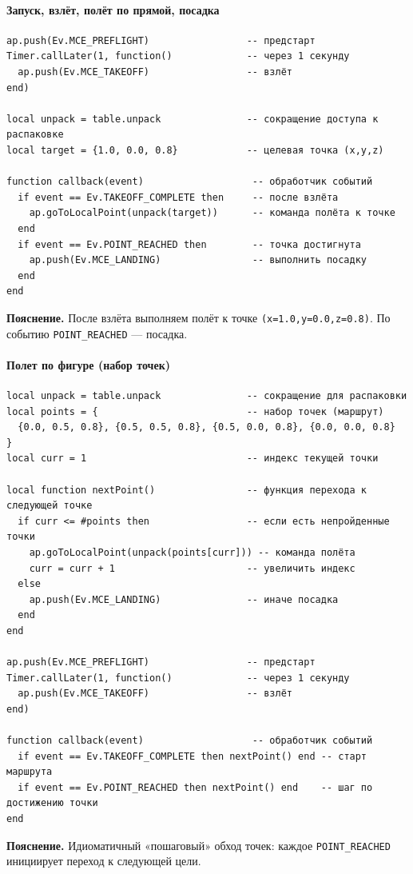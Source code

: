 \paragraph{Запуск, взлёт, полёт по прямой, посадка}
\begin{verbatim}
ap.push(Ev.MCE_PREFLIGHT)                 -- предстарт
Timer.callLater(1, function()             -- через 1 секунду
  ap.push(Ev.MCE_TAKEOFF)                 -- взлёт
end)

local unpack = table.unpack               -- сокращение доступа к распаковке
local target = {1.0, 0.0, 0.8}            -- целевая точка (x,y,z)

function callback(event)                   -- обработчик событий
  if event == Ev.TAKEOFF_COMPLETE then     -- после взлёта
    ap.goToLocalPoint(unpack(target))      -- команда полёта к точке
  end
  if event == Ev.POINT_REACHED then        -- точка достигнута
    ap.push(Ev.MCE_LANDING)                -- выполнить посадку
  end
end
\end{verbatim}
\textbf{Пояснение.} После взлёта выполняем полёт к точке \texttt{(x=1.0,y=0.0,z=0.8)}. По событию \texttt{POINT\_REACHED} — посадка.

\paragraph{Полет по фигуре (набор точек)}
\begin{verbatim}
local unpack = table.unpack               -- сокращение для распаковки
local points = {                          -- набор точек (маршрут)
  {0.0, 0.5, 0.8}, {0.5, 0.5, 0.8}, {0.5, 0.0, 0.8}, {0.0, 0.0, 0.8}
}
local curr = 1                            -- индекс текущей точки

local function nextPoint()                -- функция перехода к следующей точке
  if curr <= #points then                 -- если есть непройденные точки
    ap.goToLocalPoint(unpack(points[curr])) -- команда полёта
    curr = curr + 1                       -- увеличить индекс
  else
    ap.push(Ev.MCE_LANDING)               -- иначе посадка
  end
end

ap.push(Ev.MCE_PREFLIGHT)                 -- предстарт
Timer.callLater(1, function()             -- через 1 секунду
  ap.push(Ev.MCE_TAKEOFF)                 -- взлёт
end)

function callback(event)                   -- обработчик событий
  if event == Ev.TAKEOFF_COMPLETE then nextPoint() end -- старт маршрута
  if event == Ev.POINT_REACHED then nextPoint() end    -- шаг по достижению точки
end
\end{verbatim}
\textbf{Пояснение.} Идиоматичный «пошаговый» обход точек: каждое \texttt{POINT\_REACHED} инициирует переход к следующей цели.

